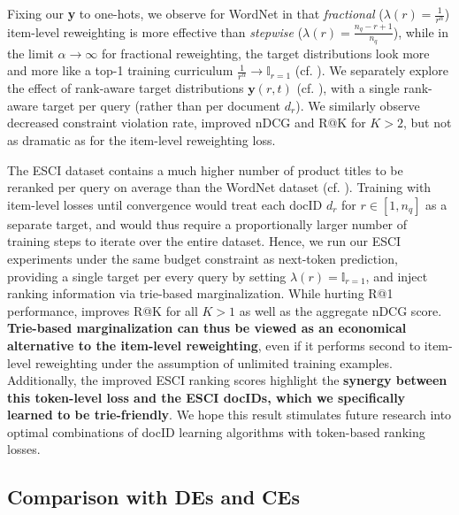 \documentclass[11pt, a4paper, onecolumn, confidential, copyright, gdm]{google}
\begin{document}
Fixing our \textbf{y} to one-hots, we observe for WordNet in  that \textit{fractional} ($\lambda(r) = \frac{1}{r^\alpha}$) item-level reweighting is more effective than \textit{stepwise} ($\lambda(r) = \frac{n_q - r + 1}{n_q}$), while in the limit $\alpha \rightarrow \infty$ for fractional reweighting, the target distributions look more and more like a top-1 training curriculum $\frac{1}{r^\alpha} \rightarrow \mathbb{I}_{r=1}$ (cf. ). We separately explore the effect of rank-aware target distributions $\mathbf{y}(r,t)$ (cf. ), with a single rank-aware target per query (rather than per document $d_r$). We similarly observe decreased constraint violation rate, improved nDCG and R@K for $K > 2$, but not as dramatic as for the item-level reweighting loss.

The ESCI dataset contains a much higher number of product titles to be reranked per query on average than the WordNet dataset (cf. ). Training with item-level losses until convergence would treat each docID $d_r$ for $r \in [1, n_q]$ as a separate target, and would thus require a proportionally larger number of training steps to iterate over the entire dataset. Hence, we run our ESCI experiments under the same budget constraint as next-token prediction, providing a single target per every query by setting $\lambda(r) = \mathbb{I}_{r=1}$, and inject ranking information via trie-based marginalization. While hurting R@1 performance,  improves R@K for all $K>1$ as well as the aggregate nDCG score. \textbf{Trie-based marginalization can thus be viewed as an economical alternative to the item-level reweighting}, even if it performs second to item-level reweighting under the assumption of unlimited training examples. Additionally, the improved ESCI ranking scores highlight the \textbf{synergy between this token-level loss and the ESCI docIDs, which we specifically learned to be trie-friendly}. We hope this result stimulates future research into optimal combinations of docID learning algorithms with token-based ranking losses.

\subsection{Comparison with DEs and CEs}\label{sec:comparison-with-de-and-ce}
\vspace{0.2cm}
\end{document}

